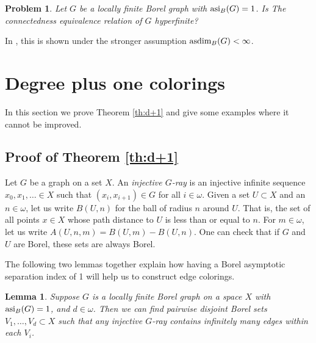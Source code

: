 \documentclass[12pt]{article}
\newcommand{\0}{\varnothing}
\newcommand{\asdim}{\textnormal{asdim}}
\newcommand{\asi}{\textnormal{asi}}
\newtheorem{lemma}{Lemma}
\newtheorem{prob}{Problem}
\begin{document}
\begin{prob}\label{prob:hyperfinite}
Let $G$ be a locally finite Borel graph with $\asi_B(G) = 1$. Is The connectedness equivalence relation of $G$ hyperfinite?
\end{prob}

In \cite{dim}, this is shown under the stronger assumption $\asdim_B(G) < \infty$.


\section{Degree plus one colorings}\label{sec:d+1}


In this section we prove Theorem \ref{th:d+1} and give some examples where it cannot be improved. 

\subsection{Proof of Theorem \ref{th:d+1}}

Let $G$ be a graph on a set $X$. An \textit{injective $G$-ray} is an injective infinite sequence $x_0,x_1,\ldots \in X$ such that $(x_i,x_{i+1}) \in G$ for all $i \in \omega$. Given a set $U \subset X$ and an $n \in \omega$, let us write $B(U,n)$ for the ball of radius $n$ around $U$. That is, the set of all points $x \in X$ whose path distance to $U$ is less than or equal to $n$. For $m \in \omega$, let us write $A(U,n,m) = B(U,m)-B(U,n)$. One can check that if $G$ and $U$ are Borel, these sets are always Borel.

The following two lemmas together explain how having a Borel asymptotic separation index of 1 will help us to construct edge colorings.

\begin{lemma}\label{lem:rainbow}
Suppose $G$ is a locally finite Borel graph on a space $X$ with $\asi_B(G) = 1$, and $d \in \omega$. Then we can find pairwise disjoint Borel sets $V_1,\ldots,V_d \subset X$ such that any injective $G$-ray contains infinitely many edges within each $V_i$.
\end{lemma}
\end{document}
